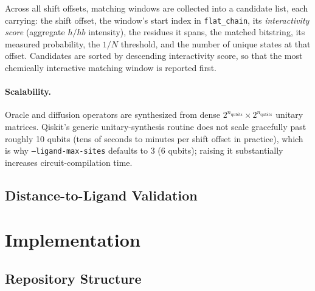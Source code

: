 \documentclass[11pt,a4paper]{article}
\begin{document}
Across all shift offsets, matching windows are collected into a candidate list, each carrying: the shift offset, the window's start index in \texttt{flat\_chain}, its \emph{interactivity score} (aggregate $h/hb$ intensity), the residues it spans, the matched bitstring, its measured probability, the $1/N$ threshold, and the number of unique states at that offset. Candidates are sorted by descending interactivity score, so that the most chemically interactive matching window is reported first.

\paragraph{Scalability.} Oracle and diffusion operators are synthesized from dense $2^{n_{\text{qubits}}} \times 2^{n_{\text{qubits}}}$ unitary matrices. Qiskit's generic unitary-synthesis routine does not scale gracefully past roughly 10 qubits (tens of seconds to minutes per shift offset in practice), which is why \texttt{--ligand-max-sites} defaults to 3 (6 qubits); raising it substantially increases circuit-compilation time.

\subsection{Distance-to-Ligand Validation}
\label{sec:validation}


\section{Implementation}

\subsection{Repository Structure}
\end{document}

